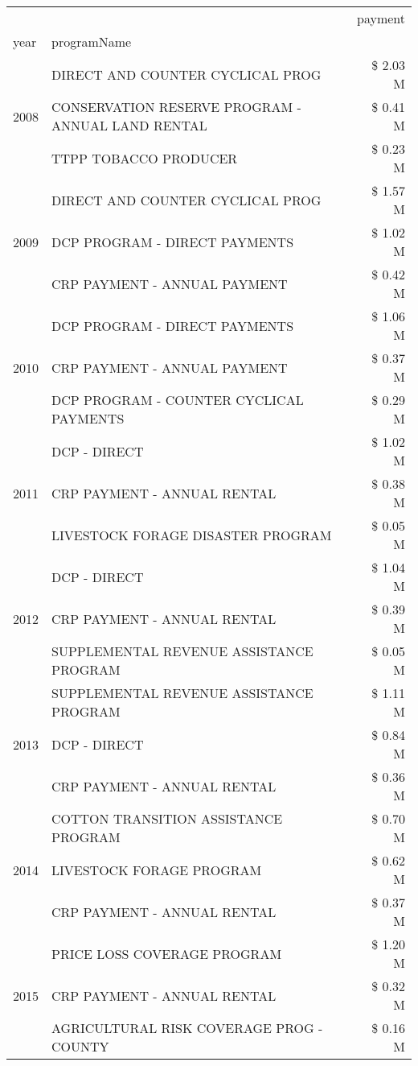 \begin{tabular}{llr}
\toprule
 &  & payment \\
year & programName &  \\
\midrule
\multirow[t]{3}{*}{2008} & DIRECT AND COUNTER CYCLICAL PROG & \$ 2.03 M \\
 & CONSERVATION RESERVE PROGRAM - ANNUAL LAND RENTAL & \$ 0.41 M \\
 & TTPP TOBACCO PRODUCER & \$ 0.23 M \\
\cline{1-3}
\multirow[t]{3}{*}{2009} & DIRECT AND COUNTER CYCLICAL PROG & \$ 1.57 M \\
 & DCP PROGRAM - DIRECT PAYMENTS & \$ 1.02 M \\
 & CRP PAYMENT - ANNUAL PAYMENT & \$ 0.42 M \\
\cline{1-3}
\multirow[t]{3}{*}{2010} & DCP PROGRAM - DIRECT PAYMENTS & \$ 1.06 M \\
 & CRP PAYMENT - ANNUAL PAYMENT & \$ 0.37 M \\
 & DCP PROGRAM - COUNTER CYCLICAL PAYMENTS & \$ 0.29 M \\
\cline{1-3}
\multirow[t]{3}{*}{2011} & DCP - DIRECT & \$ 1.02 M \\
 & CRP PAYMENT - ANNUAL RENTAL & \$ 0.38 M \\
 & LIVESTOCK FORAGE DISASTER PROGRAM & \$ 0.05 M \\
\cline{1-3}
\multirow[t]{3}{*}{2012} & DCP - DIRECT & \$ 1.04 M \\
 & CRP PAYMENT - ANNUAL RENTAL & \$ 0.39 M \\
 & SUPPLEMENTAL REVENUE ASSISTANCE PROGRAM & \$ 0.05 M \\
\cline{1-3}
\multirow[t]{3}{*}{2013} & SUPPLEMENTAL REVENUE ASSISTANCE PROGRAM & \$ 1.11 M \\
 & DCP - DIRECT & \$ 0.84 M \\
 & CRP PAYMENT - ANNUAL RENTAL & \$ 0.36 M \\
\cline{1-3}
\multirow[t]{3}{*}{2014} & COTTON TRANSITION ASSISTANCE PROGRAM & \$ 0.70 M \\
 & LIVESTOCK FORAGE PROGRAM & \$ 0.62 M \\
 & CRP PAYMENT - ANNUAL RENTAL & \$ 0.37 M \\
\cline{1-3}
\multirow[t]{3}{*}{2015} & PRICE LOSS COVERAGE PROGRAM & \$ 1.20 M \\
 & CRP PAYMENT - ANNUAL RENTAL & \$ 0.32 M \\
 & AGRICULTURAL RISK COVERAGE PROG - COUNTY & \$ 0.16 M \\
\cline{1-3}

\end{tabular}

